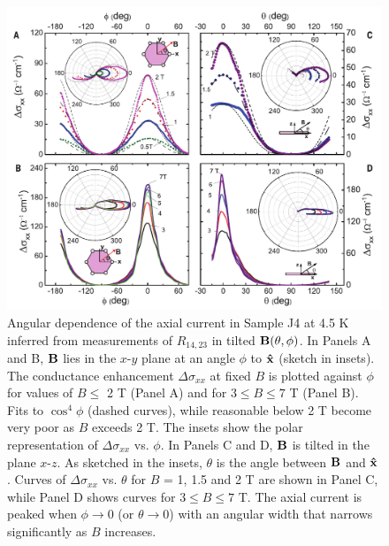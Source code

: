 \begin{figure}[!htbp]
  \begin{center}
\includegraphics[width=1\linewidth]{ch-na3bi/figures/FigPolar4.pdf}
\caption{\label{figPolar4} 
Angular dependence of the axial current in Sample J4 at 4.5 K inferred from measurements of $R_{14,23}$ in tilted ${\bf B}(\theta,\phi)$. 
In Panels A and B, $\bf B$ lies in the $x$-$y$ plane at an angle $\phi$ to $\bf\hat{x}$ (sketch in insets). The 
conductance enhancement $\Delta \sigma_{xx}$ at fixed $B$ is plotted against $\phi$ for values of $B \le$ 2 T (Panel A) and for $3\le B\le 7$ T (Panel B). Fits to $\cos^4\phi$ (dashed curves), while reasonable below 2 T become very poor as $B$ exceeds 2 T. The insets show the polar representation of $\Delta \sigma_{xx}$ vs. $\phi$. In Panels C and D, $\bf B$ is tilted in the plane $x$-$z$. As sketched in the insets, $\theta$ is the angle between $\bf B$ and $\bf\hat{x}$. Curves of $\Delta \sigma_{xx}$ vs. $\theta$ for $B$ = 1, 1.5 and 2 T are shown in Panel C, while Panel D shows curves for $3\le B\le 7$ T. The axial current is peaked when $\phi\to 0$ (or $\theta\to 0$) with an angular width that narrows significantly as $B$ increases.
}
  \end{center}
\end{figure}

